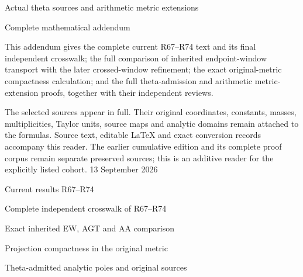 \documentclass[10pt,a4paper]{article}
\begin{document}
\hypersetup{pageanchor=false}
\begin{titlepage}
\vspace*{25mm}
{\sffamily\LARGE Actual theta sources and arithmetic metric extensions\par}
\vspace{8mm}
{\sffamily\Large Complete mathematical addendum\par}
\vspace{12mm}
This addendum gives the complete current R67--R74 text and its final
independent crosswalk; the full comparison of inherited endpoint-window
transport with the later crossed-window refinement; the exact original-metric
compactness calculation; and the full theta-admission and arithmetic
metric-extension proofs, together with their independent reviews.

The selected sources appear in full. Their original coordinates, constants,
masses, multiplicities, Taylor units, source maps and analytic domains remain
attached to the formulas. Source text, editable LaTeX and exact conversion
records accompany this reader. The earlier cumulative edition and its complete
proof corpus remain separate preserved sources; this is an additive reader
for the explicitly listed cohort.
\vfill
13 September 2026
\end{titlepage}
\hypersetup{pageanchor=true}
\tableofcontents\clearpage{}

\clearpage{}
{}
{\sffamily\Large Current results R67--R74\par}
\medskip


\clearpage{}
{}
{\sffamily\Large Complete independent crosswalk of R67--R74\par}
\medskip


\clearpage{}
{}
{\sffamily\Large Exact inherited EW, AGT and AA comparison\par}
\medskip


\clearpage{}
{}
{\sffamily\Large Projection compactness in the original metric\par}
\medskip


\clearpage{}
{}
{\sffamily\Large Theta-admitted analytic poles and original sources\par}
\medskip

\end{document}
